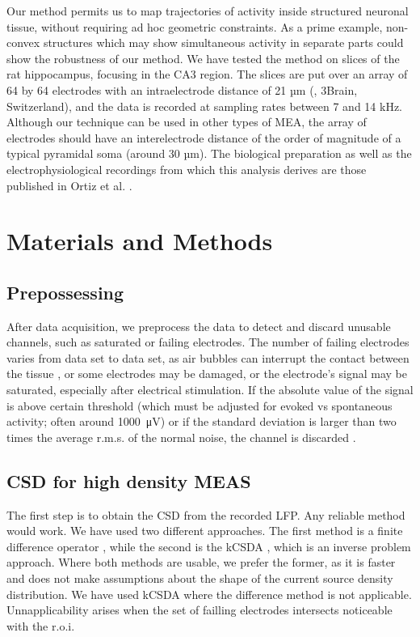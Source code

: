 \documentclass[letterpaper,12pts]{article}
\newcommand{\muV}[1]{\SI{#1}{\micro\volt}}
\begin{document}
Our method permits us to map trajectories of activity inside structured neuronal tissue, without requiring ad hoc geometric constraints. As a prime example, non-convex structures which may show simultaneous activity in separate parts could show the robustness of our method. We have tested the method on slices of the rat hippocampus, focusing in the CA3 region. The slices are put over an array of 64 by 64 electrodes with an intraelectrode distance of 21 µm (\cite{BioCam}, 3Brain, Switzerland), and the data is recorded at sampling rates between 7 and 14 kHz. Although our technique can be used in other types of MEA, the array of electrodes should have an interelectrode distance of the order of magnitude of a typical pyramidal soma (around 30 µm). The biological preparation as well as the electrophysiological recordings from which this analysis derives are those published in Ortiz et al. \cite{Franco2018}.



\section{Materials and Methods}

\subsection{Prepossessing}

After data acquisition, we preprocess the data to detect and discard unusable channels,
such as saturated or failing electrodes. The
number of failing electrodes varies from data set to data set,
as air bubbles can interrupt the contact between the tissue
, or some electrodes may be damaged, or the electrode’s signal may be saturated, especially after electrical stimulation. If the absolute value of the signal is above certain threshold (which must be adjusted for evoked vs spontaneous activity; often around \muV{1000}) or if the standard deviation is larger than two times the average r.m.s. of the normal noise, the channel is discarded \cite{Franco2018}. 


\subsection{CSD for high density MEAS}

The first step is to obtain the CSD from the recorded LFP.
Any reliable method would work.
We have used two different
approaches. The first method is a  finite difference operator \cite{Lindberg90},
while the second is the kCSDA \cite{Potworowski2011},
which is an inverse problem approach.
Where both methods are usable, we prefer the former,
as it is faster and does not make assumptions about the shape of the
current source density distribution.
We have used kCSDA where
the difference method is not applicable. Unnapplicability arises when
the set of failling electrodes intersects noticeable with the r.o.i.
\end{document}
